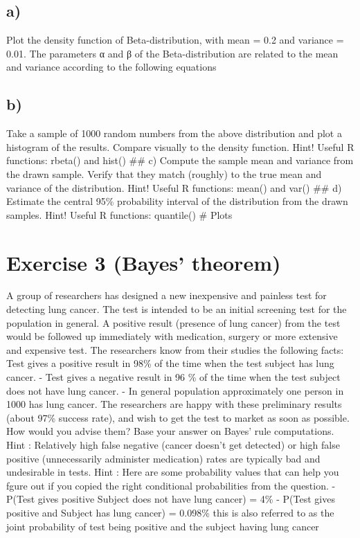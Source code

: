 \documentclass[
]{article}
\begin{document}
\hypertarget{a}{%
\subsection{a)}\label{a}}

Plot the density function of Beta-distribution, with mean = 0.2 and
variance = 0.01. The parameters α and β of the Beta-distribution are
related to the mean and variance according to the following equations

\hypertarget{b}{%
\subsection{b)}\label{b}}

Take a sample of 1000 random numbers from the above distribution and
plot a histogram of the results. Compare visually to the density
function. Hint! Useful R functions: rbeta() and hist() \#\# c) Compute
the sample mean and variance from the drawn sample. Verify that they
match (roughly) to the true mean and variance of the distribution. Hint!
Useful R functions: mean() and var() \#\# d) Estimate the central 95\%
probability interval of the distribution from the drawn samples. Hint!
Useful R functions: quantile() \# Plots

\hypertarget{exercise-3-bayes-theorem}{%
\section{Exercise 3 (Bayes' theorem)}\label{exercise-3-bayes-theorem}}

A group of researchers has designed a new inexpensive and painless test
for detecting lung cancer. The test is intended to be an initial
screening test for the population in general. A positive result
(presence of lung cancer) from the test would be followed up immediately
with medication, surgery or more extensive and expensive test. The
researchers know from their studies the following facts: Test gives a
positive result in 98\% of the time when the test subject has lung
cancer. - Test gives a negative result in 96 \% of the time when the
test subject does not have lung cancer. - In general population
approximately one person in 1000 has lung cancer. The researchers are
happy with these preliminary results (about 97\% success rate), and wish
to get the test to market as soon as possible. How would you advise
them? Base your answer on Bayes' rule computations. Hint : Relatively
high false negative (cancer doesn't get detected) or high false positive
(unnecessarily administer medication) rates are typically bad and
undesirable in tests. Hint : Here are some probability values that can
help you fgure out if you copied the right conditional probabilities
from the question. - P(Test gives positive \textbar{} Subject does not
have lung cancer) = 4\% - P(Test gives positive and Subject has lung
cancer) = 0.098\% this is also referred to as the joint probability of
test being positive and the subject having lung cancer
\end{document}
